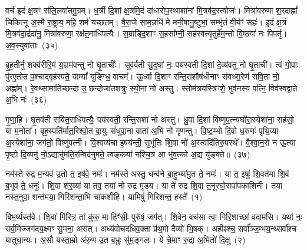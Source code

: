 वर्च॑ इ॒दं क्ष॒त्रꣳ स॑लि॒लवा॑तमु॒ग्रम्। ध॒र्त्री दि॒शां क्ष॒त्रमि॒दं दा॑धारोप॒स्थाशा॑नां मि॒त्रव॑द॒स्त्वोजः॑। मित्रा॑वरुणा श॒रदाह्नां᳚ चिकित्नू अ॒स्मै रा॒ष्ट्राय॒ महि॒ शर्म॑ यच्छतम्। वै॒रा॒जे साम॒न्नधि॑ मे मनी॒षानु॒ष्टुभा॒ सम्भृ॑तं वी॒र्यꣳ॑ सहः॑। इ॒दं क्ष॒त्रं मि॒त्रव॑दा॒र्द्रदा॑नु॒ मित्रा॑वरुणा॒ रक्ष॑त॒माधि॑पत्यैः। स॒म्राड्दि॒शाꣳ स॒हसा᳚म्नी॒ सह॑स्वत्यृ॒तुर्\mbox{}हे॑म॒न्तो वि॒ष्ठया॑ नः पिपर्तु। अ॒व॒स्युवा॑ताः~(३५)

बृ॒ह॒तीर्नु शक्व॑रीरि॒मं य॒ज्ञम॑वन्तु नो घृ॒ताचीः᳚। सुव॑र्वती सु॒दुघा॑ नः॒ पय॑स्वती दि॒शां दे॒व्य॑वतु नो घृ॒ताची᳚। त्वं गो॒पाः पु॑रए॒तोत प॒श्चाद्बृह॑स्पते॒ याम्यां᳚ युङ्ग्धि॒ वाचम्᳚। ऊ॒र्ध्वा दि॒शाꣳ रन्ति॒राशौष॑धीनाꣳ संवथ्स॒रेण॑ सवि॒ता नो॒ अह्ना᳚म्। रे॒वथ्सामाति॑च्छन्दा उ॒ छन्दोजा॑तशत्रुः स्यो॒ना नो॑ अस्तु। स्तोम॑त्रयस्त्रिꣳशे॒ भुव॑नस्य पत्नि॒ विव॑स्वद्वाते अ॒भि नः॑~(३६)

गृ॒णा॒हि॒। घृ॒तव॑ती सवित॒राधि॑पत्यैः॒ पय॑स्वती॒ रन्ति॒राशा॑ नो अस्तु। ध्रु॒वा दि॒शां वि॑ष्णुप॒त्न्यघो॑रा॒स्येशा॑ना॒ सह॑सो॒ या म॒नोता᳚। बृह॒स्पति॑र्मात॒रिश्वो॒त वा॒युः सं॑धुवा॒ना वाता॑ अ॒भि नो॑ गृणन्तु। वि॒ष्ट॒म्भो दि॒वो ध॒रुणः॑ पृथि॒व्या अ॒स्येशा॑ना॒ जग॑तो॒ विष्णु॑पत्नी। वि॒श्वव्य॑चा इ॒षय॑न्ती॒ सुभू॑तिः शि॒वा नो॑ अ॒स्त्वदि॑तिरु॒पस्थे᳚। वै॒श्वा॒न॒रो न॑ ऊ॒त्या पृ॒ष्टो दि॒व्यनु॑ नो॒\-ऽद्यानु॑मति॒रन्विद॑नुमते॒ त्वङ्कया॑ नश्चि॒त्र आ भु॑व॒त्को अ॒द्य यु॑ङ्क्ते॥~(३७)

{\anuvakamend[{महि॑ सप्तद॒शेना॑व॒स्युवा॑ता अ॒भि नो\-ऽनु॑ न॒श्चतु॑र्दश च}]}%


{\anuvakamend[{नम॑स्ते रुद्र॒ नमो॒ हिर॑ण्यबाहवे॒ नमः॒ सह॑मानाय॒ नम॑ आव्या॒धिनी᳚भ्यो॒ नमो॑ भ॒वाय॒ नमो᳚ ज्ये॒ष्ठाय॒ नमो॑ दुन्दु॒भ्या॑य॒ नमः॒ सोमा॑य॒ नम॑ इरि॒ण्या॑य॒ द्रापे॑ स॒हस्रा॒ण्येका॑\-दश}]}%
{}

\setcounter{anuvakam}{0}
नम॑स्ते रुद्र म॒न्यव॑ उ॒तो त॒ इष॑वे॒ नमः॑। नम॑स्ते अस्तु॒ धन्व॑ने बा॒हुभ्या॑मु॒त ते॒ नमः॑। या त॒ इषुः॑ शि॒वत॑मा शि॒वं ब॒भूव॑ ते॒ धनुः॑। शि॒वा श॑र॒व्या॑ या तव॒ तया॑ नो रुद्र मृडय। या ते॑ रुद्र शि॒वा त॒नूरघो॒रापा॑पकाशिनी। तया॑ नस्त॒नुवा॒ शन्त॑मया॒ गिरि॑शन्ता॒भि चा॑कशीहि। यामिषुं॑ गिरिशन्त॒ हस्ते᳚~(१)

बिभ॒र्ष्यस्त॑वे। शि॒वां गि॑रित्र॒ तां कु॑रु॒ मा हिꣳ॑सीः॒ पुरु॑षं॒ जग॑त्। शि॒वेन॒ वच॑सा त्वा॒ गिरि॒शाच्छा॑ वदामसि। यथा॑ नः॒ सर्व॒मिज्जग॑दय॒क्ष्मꣳ सु॒मना॒ अस॑त्। अध्य॑वोचदधिव॒क्ता प्र॑थ॒मो दैव्यो॑ भि॒षक्। अहीꣴ॑श्च॒ सर्वा᳚ञ्ज॒म्भय॒न्थ्सर्वा᳚श्च यातुधा॒न्यः॑। अ॒सौ यस्ता॒म्रो अ॑रु॒ण उ॒त ब॒भ्रुः सु॑म॒ङ्गलः॑। ये चे॒माꣳ रु॒द्रा अ॒भितो॑ दि॒क्षु~(२)

